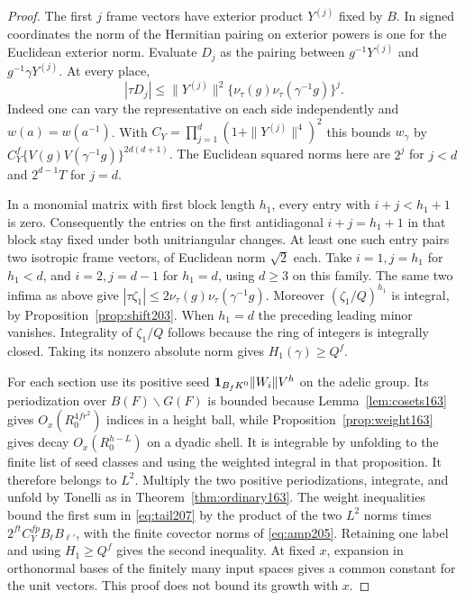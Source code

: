 \documentclass[a4paper,11pt]{article}
\theoremstyle{definition}
\theoremstyle{remark}
\numberwithin{equation}{section}
\begin{document}
\begin{proof}
The first \(j\) frame vectors have exterior product \(Y^{(j)}\)
fixed by \(B\). In signed coordinates the norm of the Hermitian
pairing on exterior powers is one for the Euclidean exterior norm.
Evaluate \(D_j\) as the pairing between
\(g^{-1}Y^{(j)}\) and \(g^{-1}\gamma Y^{(j)}\). At every place,
\[
 |\tau D_j|
 \le \|Y^{(j)}\|^2
       \{\nu_\tau(g)\nu_\tau(\gamma^{-1}g)\}^{j}.
\]
Indeed one can vary the representative on each side independently
and \(w(a)=w(a^{-1})\). With
\(C_Y=\prod_{j=1}^d(1+\|Y^{(j)}\|^4)^2\) this bounds \(w_\gamma\)
by \(C_Y^f\{V(g)V(\gamma^{-1}g)\}^{2d(d+1)}\).
The Euclidean squared norms here are \(2^j\) for \(j<d\) and
\(2^{d-1}T\) for \(j=d\).

In a monomial matrix with first block length \(h_1\), every
entry with \(i+j<h_1+1\) is zero. Consequently the entries on
the first antidiagonal \(i+j=h_1+1\) in that block stay fixed
under both unitriangular changes. At least one such entry pairs
two isotropic frame vectors, of Euclidean norm \(\sqrt2\) each.
Take \(i=1,j=h_1\) for \(h_1<d\), and \(i=2,j=d-1\)
for \(h_1=d\), using \(d\ge3\) on this family. The same two
infima as above give \(|\tau\zeta_1|\le
2\nu_\tau(g)\nu_\tau(\gamma^{-1}g)\).
Moreover \((\zeta_1/Q)^{h_1}\) is integral, by
Proposition~\ref{prop:shift203}. When \(h_1=d\) the preceding
leading minor vanishes. Integrality of \(\zeta_1/Q\) follows
because the ring of integers is integrally closed. Taking its
nonzero absolute norm gives \(H_1(\gamma)\ge Q^f\).

For each section use its positive seed
\({\bf1}_{B_fK^0}\|W_i\| V^h\) on the adelic group.
Its periodization over \(B(F)\backslash G(F)\) is bounded because
Lemma~\ref{lem:cosets163} gives \(O_x(R_0^{4fr^2})\) indices in a
height ball, while Proposition~\ref{prop:weight163} gives decay
\(O_x(R_0^{h-L})\) on a dyadic shell. It is integrable by unfolding
to the finite list of seed classes and using the weighted integral
in that proposition. It therefore belongs to \(L^2\). Multiply
the two positive periodizations, integrate, and unfold by Tonelli
as in Theorem~\ref{thm:ordinary163}. The weight inequalities bound
the first sum in \eqref{eq:tail207} by the product of the two
\(L^2\) norms times \(2^{ft} C_Y^{fp}B_\ell B_{\ell'}\), with the
finite covector norms of \eqref{eq:amp205}. Retaining one label
and using \(H_1\ge Q^f\) gives the second inequality. At fixed
\(x\), expansion in orthonormal bases of the finitely many input
spaces gives a common constant for the unit vectors. This proof
does not bound its growth with \(x\).
\end{proof}
\end{document}
